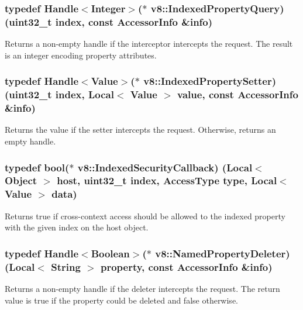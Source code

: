 \subsubsection[{Indexed\+Property\+Query}]{\setlength{\rightskip}{0pt plus 5cm}typedef {\bf Handle}$<${\bf Integer}$>$($\ast$ v8\+::\+Indexed\+Property\+Query) (uint32\+\_\+t index, const {\bf Accessor\+Info} \&info)}\label{namespacev8_ac84ffd0beb05009f30378ef45a065edf}
Returns a non-\/empty handle if the interceptor intercepts the request. The result is an integer encoding property attributes. \hypertarget{namespacev8_a3ca53e294b9b695b3777af904ca942b6}{}
\subsubsection[{Indexed\+Property\+Setter}]{\setlength{\rightskip}{0pt plus 5cm}typedef {\bf Handle}$<${\bf Value}$>$($\ast$ v8\+::\+Indexed\+Property\+Setter) (uint32\+\_\+t index, {\bf Local}$<$ {\bf Value} $>$ value, const {\bf Accessor\+Info} \&info)}\label{namespacev8_a3ca53e294b9b695b3777af904ca942b6}
Returns the value if the setter intercepts the request. Otherwise, returns an empty handle. \hypertarget{namespacev8_aebbcc7837753e51112d944ad96520da1}{}
\subsubsection[{Indexed\+Security\+Callback}]{\setlength{\rightskip}{0pt plus 5cm}typedef bool($\ast$ v8\+::\+Indexed\+Security\+Callback) ({\bf Local}$<$ {\bf Object} $>$ host, uint32\+\_\+t index, {\bf Access\+Type} type, {\bf Local}$<$ {\bf Value} $>$ data)}\label{namespacev8_aebbcc7837753e51112d944ad96520da1}
Returns true if cross-\/context access should be allowed to the indexed property with the given index on the host object. \hypertarget{namespacev8_a7899471fae82b252750b81f41d5c1e26}{}
\subsubsection[{Named\+Property\+Deleter}]{\setlength{\rightskip}{0pt plus 5cm}typedef {\bf Handle}$<${\bf Boolean}$>$($\ast$ v8\+::\+Named\+Property\+Deleter) ({\bf Local}$<$ {\bf String} $>$ property, const {\bf Accessor\+Info} \&info)}\label{namespacev8_a7899471fae82b252750b81f41d5c1e26}
Returns a non-\/empty handle if the deleter intercepts the request. The return value is true if the property could be deleted and false otherwise. \hypertarget{namespacev8_acbd04b83708cb5a80e73e0396f176e58}{}
